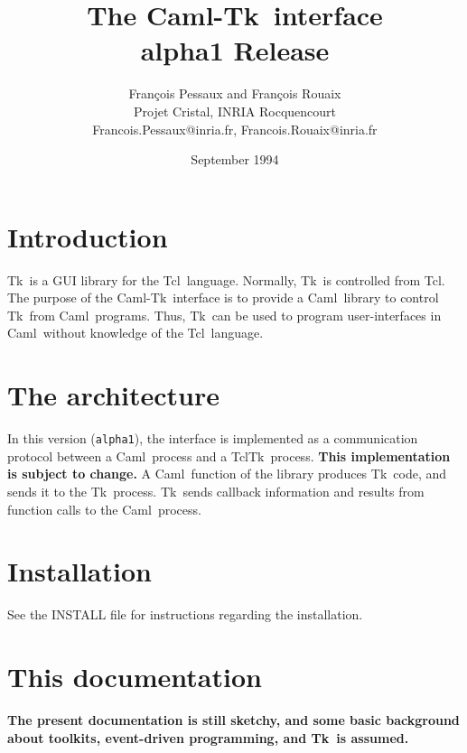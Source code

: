 
\newcommand{\tcl}{{\sf Tcl}}
\newcommand{\tk}{{\sf Tk}}
\newcommand{\caml}{{\sf Caml}}
\newcommand{\camltk}{{\sf Caml-Tk}}
\title{The \caml-\tk\ interface \\
       alpha1 Release}
\author{Fran\c{c}ois Pessaux and Fran\c{c}ois Rouaix \\
           Projet Cristal, INRIA Rocquencourt \\
        {\small Francois.Pessaux@inria.fr, Francois.Rouaix@inria.fr}
        }
\date{September 1994}

\maketitle


\section*{Introduction}
\tk\ is a GUI library for the \tcl\ language. Normally, \tk\ is controlled
from \tcl. The purpose of the \camltk\ interface is to provide a \caml\
library to control \tk\ from \caml\ programs. Thus, \tk\ can be used to
program user-interfaces in \caml\ without knowledge of the \tcl\ language.

\section*{The architecture}
In this version (\verb|alpha1|), the interface is implemented as a
communication protocol between a \caml\ process and a \tcl\tk\ process.
{\bf This implementation is subject to change.}
A \caml\ function of the library produces \tk\ code, and sends it to the
\tk\ process. \tk\ sends callback information and results from function
calls to the \caml\ process.


\section*{Installation}
See the INSTALL file for instructions regarding the installation.


\section*{This documentation}
{\bf The present documentation is still sketchy, and some basic background
about toolkits, event-driven programming, and \tk\ is assumed.}

